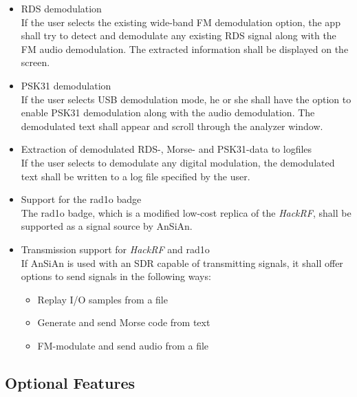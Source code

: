 \begin{itemize}
	\item \ac{RDS} demodulation \\
		If the user selects the existing wide-band \ac{FM} demodulation option,
		the app shall try to detect and demodulate any existing \ac{RDS}
		signal along with the \ac{FM} audio demodulation. The extracted information
		shall be displayed on the screen.
	\item \ac{PSK31} demodulation \\
		If the user selects \ac{USB} demodulation mode, he or she shall have
		the option to enable \ac{PSK31} demodulation along with the audio
		demodulation.  The demodulated text shall appear and scroll
		through the analyzer window.
	\item Extraction of demodulated \ac{RDS}-, Morse- and \ac{PSK31}-data to logfiles \\
		If the user selects to demodulate any digital modulation, the demodulated
		text shall be written to a log file specified by the user.
	\item Support for the rad1o badge \\
		The rad1o badge, which is a modified low-cost replica of the \emph{HackRF},
		shall be supported as a signal source by \ac{AnSiAn}.
	\item Transmission support for \emph{HackRF} and rad1o \\
		If \ac{AnSiAn} is used with an \ac{SDR} capable of transmitting signals,
		it shall offer options to send signals in the following ways:
		\begin{itemize}
			\item Replay I/O samples from a file
			\item Generate and send Morse code from text
			\item FM-modulate and send audio from a file
		\end{itemize}
\end{itemize}

\subsection{Optional Features}


